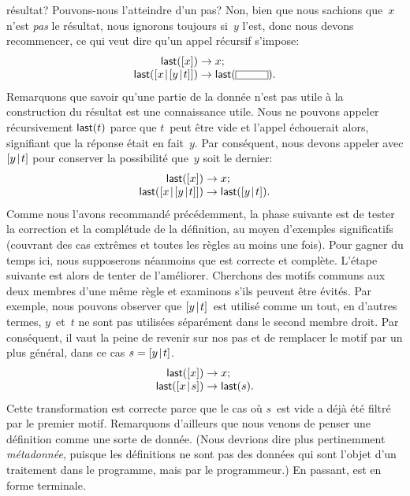 résultat? Pouvons-nous l'atteindre d'un pas? Non, bien que nous
sachions que~\(x\) n'est \emph{pas} le résultat, nous ignorons
toujours si~\(y\) l'est, donc nous devons recommencer, ce qui veut
dire qu'un appel récursif s'impose:
\begin{equation*}
\begin{array}{r@{\;}c@{\;}l}
\fun{last}([x]) & \rightarrow & x;\\
\fun{last}(\cons{x}{\cons{y}{t}}) & \rightarrow &
\fun{last}(\fbcode{CCCC}).
\end{array}
\end{equation*}
Remarquons que savoir qu'une partie de la donnée n'est pas utile à la
construction du résultat est une connaissance utile. Nous ne pouvons
appeler récursivement \(\textsf{last}(t)\) parce que \(t\)~peut être vide
et l'appel échouerait alors, signifiant que la réponse était en
fait~\(y\). Par conséquent, nous devons appeler avec \([{y}\!\mid\!{t}]\)
pour conserver la possibilité que~\(y\) soit le dernier:
\begin{equation*}
\begin{array}{r@{\;}c@{\;}l}
\fun{last}([x]) & \rightarrow & x;\\
\fun{last}(\cons{x}{\cons{y}{t}}) & \rightarrow &
\fun{last}(\cons{y}{t}).
\end{array}
\end{equation*}
Comme nous l'avons recommandé précédemment, la phase suivante est de
tester la correction et la complétude de la définition, au moyen
d'ex\-em\-ples significatifs (couvrant des cas extrêmes et toutes les
règles au moins une fois). Pour gagner du temps ici, nous supposerons
néanmoins que  est correcte et complète. L'étape suivante
est alors de tenter de l'améliorer. Cherchons des motifs communs aux
deux membres d'une même règle et examinons s'ils peuvent être
évités. Par exemple, nous pouvons observer que \([{y}\!\mid\!{t}]\)~est
utilisé comme un tout, en d'autres termes, \(y\)~et~\(t\) ne sont pas
utilisées séparément dans le second membre droit. Par conséquent, il
vaut la peine de revenir sur nos pas et de remplacer le motif par un
plus général, dans ce cas \(s = [{y}\!\mid\!{t}]\).
\begin{equation*}
\begin{array}{r@{\;}c@{\;}l}
\fun{last}([x]) & \rightarrow & x;\\
\fun{last}(\cons{x}{s}) & \rightarrow & \fun{last}(s).
\end{array}
\end{equation*}
Cette transformation est correcte parce que le cas où \(s\)~est vide a
déjà été filtré par le premier motif. Remarquons d'ailleurs que nous
venons de penser une définition comme une sorte de donnée. (Nous
devrions dire plus pertinemment \emph{métadonnée}, puisque les
définitions ne sont pas des données qui sont l'objet d'un traitement
dans le programme, mais par le programmeur.) En passant, 
est en forme terminale.

